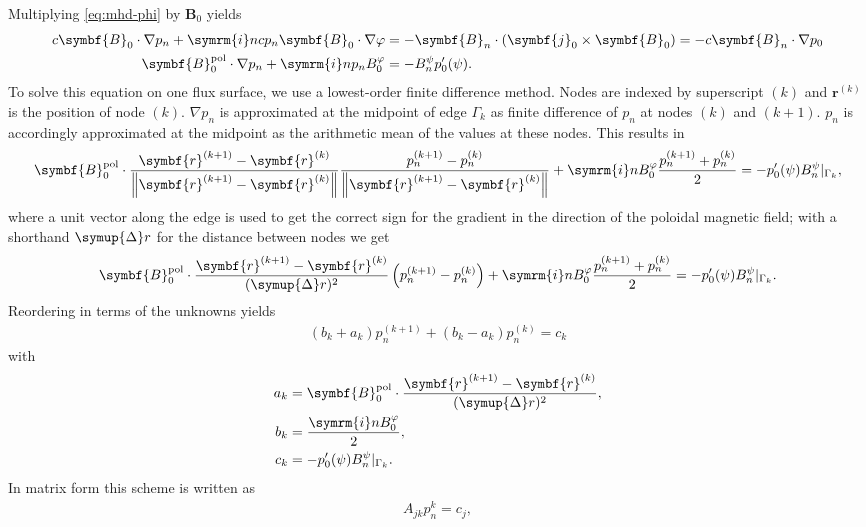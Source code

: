 \documentclass[a4paper, 10pt, english]{article}
\let\temp\vartheta
\let\vartheta\theta
\let\theta\temp
\let\temp\varphi
\let\varphi\phi
\let\phi\temp
\let\vec\symbf
\newcommand*\im{\ensuremath{\symrm{i}}}  %
\newcommand*\norm[1]{\ensuremath{\left \lVert #1 \right \rVert}}  %
\newcommand*\pol{\ensuremath{\textrm{pol}}}  %
\begin{document}
Multiplying \cref{eq:mhd-phi} by $\vec{B}_{0}$ yields
\begin{align}
  c \vec{B}_{0} \cdot \nabla p_{n} + \im n c p_{n} \vec{B}_{0} \cdot \nabla \phi &= -\vec{B}_{n} \cdot (\vec{j}_{0} \times \vec{B}_{0}) = -c \vec{B}_{n} \cdot \nabla p_{0} \nonumber \\
  \vec{B}_{0}^{\pol} \cdot \nabla p_{n} + \im n p_{n} B_{0}^{\phi} &= -B_{n}^{\psi} p_{0}'(\psi). \label{eq:pn}
\end{align}
To solve this equation on one flux surface, we use a lowest-order finite difference method. Nodes are indexed by superscript $(k)$ and $\vec{r}^{(k)}$ is the position of node $(k)$. $\nabla p_{n}$ is approximated at the midpoint of edge $\Gamma_{k}$ as finite difference of $p_{n}$ at nodes $(k)$ and $(k+1)$. $p_{n}$ is accordingly approximated at the midpoint as the arithmetic mean of the values at these nodes. This results in
\begin{gather*}
  \vec{B}_{0}^{\pol} \cdot \frac{\vec{r}^{(k+1)} - \vec{r}^{(k)}}{\norm{\vec{r}^{(k+1)} - \vec{r}^{(k)}}} \frac{p_{n}^{(k+1)} - p_{n}^{(k)}}{\norm{\vec{r}^{(k+1)} - \vec{r}^{(k)}}} + \im n B_{0}^{\phi} \frac{p_{n}^{(k+1)} + p_{n}^{(k)}}{2} = -p_{0}'(\psi) B_{n}^{\psi} \vert_{\Gamma_{k}},
\end{gather*}
where a unit vector along the edge is used to get the correct sign for the gradient in the direction of the poloidal magnetic field; with a shorthand $\symup{\Delta} r$ for the distance between nodes we get
\begin{gather}
  \vec{B}_{0}^{\pol} \cdot \frac{\vec{r}^{(k+1)} - \vec{r}^{(k)}}{(\symup{\Delta} r)^2} \left ( p_{n}^{(k+1)} - p_{n}^{(k)} \right ) + \im n B_{0}^{\phi} \frac{p_{n}^{(k+1)} + p_{n}^{(k)}}{2} = -p_{0}'(\psi) B_{n}^{\psi} \vert_{\Gamma_{k}}.
\end{gather}
Reordering in terms of the unknowns yields
\begin{gather}
  (b_{k} + a_{k}) p_{n}^{(k+1)} + (b_{k} - a_{k}) p_{n}^{(k)} = c_{k}
\end{gather}
with
\begin{align}
  a_{k} &= \vec{B}_{0}^{\pol} \cdot \frac{\vec{r}^{(k+1)} - \vec{r}^{(k)}}{(\symup{\Delta} r)^2}, \\
  b_{k} &= \frac{\im n B_{0}^{\phi}}{2}, \\
  c_{k} &= -p_{0}'(\psi) B_{n}^{\psi} \vert_{\Gamma_{k}}.
\end{align}
In matrix form this scheme is written as
\begin{gather}
  A_{jk} p_{n}^{k} = c_{j},
\end{gather}
\end{document}
